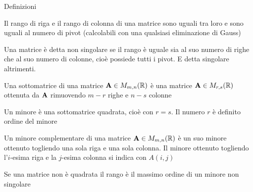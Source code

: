 \documentclass{beamer}
\begin{document}
\begin{frame}[allowframebreaks]{Definizioni}
\begin{definition}[rango]
  Il rango di riga e il rango di colonna di una matrice sono uguali tra loro e sono uguali al numero di pivot (calcolabili con una qualsiasi eliminazione di Gauss) 
\end{definition}

\begin{definition}[singolarit\`a]
  Una matrice \`e detta non singolare se il rango \`e uguale sia al suo numero di righe che al suo numero di colonne, cio\`e possiede tutti i pivot. E detta singolare altrimenti.
\end{definition}

\begin{definition}[sottomatrice]
   Una sottomatrice di una matrice
   $\mathbf{A} \in M_{m,n}(\mathbb{R})$
   \`e una matrice
   $\mathbf{A} \in M_{r,s}(\mathbb{R})$
   ottenuta da $\mathbf{A}$
   rimuovendo $m - r$ righe e $n - s$ colonne
\end{definition}
   
\begin{definition}[minore]
  Un minore \`e una sottomatrice quadrata, cio\`e con $r = s$.
  Il numero $r$ \`e definito ordine del minore
\end{definition}
   
\begin{definition}  
  Un minore complementare  di una matrice
  $\mathbf{A} \in M_{m,n}(\mathbb{R})$  \`e un suo minore ottenuto togliendo
  una sola riga e una sola colonna.
  Il minore ottenuto togliendo l'$i$-esima riga e la $j$-esima colonna si indica con
  $A(i,j)$
\end{definition}
   
\begin{definition}
  Se una matrice non \`e quadrata il rango \`e il
  massimo ordine di un minore non singolare
\end{definition}
\end{frame}
\end{document}
